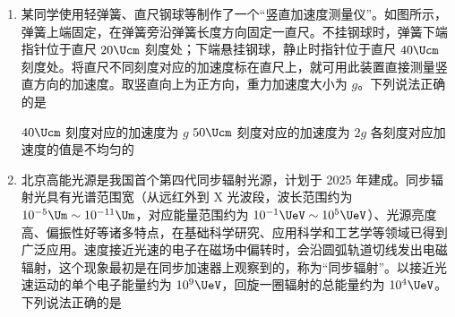 \documentclass[\gkver]{gaokaozhenti}
\begin{document}
\begin{enumerate}
{故选 A。
}

\item
某同学使用轻弹簧、直尺钢球等制作了一个“竖直加速度测量仪”。如图所示，弹簧上端固定，在弹簧旁沿弹簧长度方向固定一直尺。不挂钢球时，弹簧下端指针位于直尺 $20\Ucm$ 刻度处；下端悬挂钢球，静止时指针位于直尺 $40\Ucm$ 刻度处。将直尺不同刻度对应的加速度标在直尺上，就可用此装置直接测量竖直方向的加速度。取竖直向上为正方向，重力加速度大小为 $g$。下列说法正确的是


{$40\Ucm$ 刻度对应的加速度为 $g$}
{$50\Ucm$ 刻度对应的加速度为 $2g$}
{各刻度对应加速度的值是不均匀的}


\item
北京高能光源是我国首个第四代同步辐射光源，计划于 2025 年建成。同步辐射光具有光谱范围宽（从远红外到 X 光波段，波长范围约为 $10^{-5}\Um \sim 10^{-11}\Um$，对应能量范围约为 $10^{-1}\UeV \sim 10^{5}\UeV$）、光源亮度高、偏振性好等诸多特点，在基础科学研究、应用科学和工艺学等领域已得到广泛应用。速度接近光速的电子在磁场中偏转时，会沿圆弧轨道切线发出电磁辐射，这个现象最初是在同步加速器上观察到的，称为“同步辐射”。以接近光速运动的单个电子能量约为 $10^{9}\UeV$，回旋一圈辐射的总能量约为 $10^{4}\UeV$。下列说法正确的是


\end{enumerate}
\end{document}
